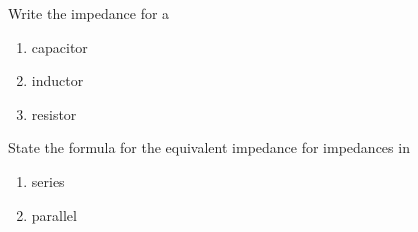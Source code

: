 

\vspace*{\fill}
\centering

Write the impedance for a 
\begin{enumerate}
    \item capacitor
    \item inductor
    \item resistor
\end{enumerate}

State the formula for the equivalent impedance for impedances in
\begin{enumerate}
    \item series 
    \item parallel
\end{enumerate}

\centering
\vspace*{\fill}

